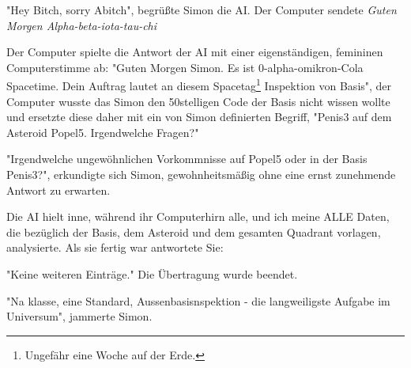 \documentclass[ebook]{article}
\begin{document}
\begin{center}
"Hey Bitch, sorry Abitch", begrüßte Simon die AI. Der
Computer sendete \emph{Guten Morgen Alpha-beta-iota-tau-chi}
\end{center}

\begin{center}
Der Computer spielte die Antwort der AI mit einer eigenständigen,
femininen Computerstimme ab: "Guten Morgen Simon. Es ist
0-alpha-omikron-Cola Spacetime. Dein Auftrag lautet an diesem
Spacetag\footnote{Ungefähr eine Woche auf der Erde.} Inspektion von Basis", der Computer wusste das Simon
den 50stelligen Code der Basis nicht wissen wollte und ersetzte
diese daher mit ein von Simon definierten Begriff, "Penis3 auf dem
Asteroid Popel5. Irgendwelche Fragen?"
\end{center}

\begin{center}
"Irgendwelche ungewöhnlichen Vorkommnisse auf Popel5 oder in der
Basis Penis3?", erkundigte sich Simon, gewohnheitsmäßig ohne eine
ernst zunehmende Antwort zu erwarten.
\end{center}

\noindent Die AI hielt inne, während ihr Computerhirn alle, und ich
meine ALLE Daten, die bezüglich der Basis, dem Asteroid und dem
gesamten Quadrant vorlagen, analysierte. Als sie fertig war
antwortete Sie:

\begin{center}
"Keine weiteren Einträge." Die Übertragung wurde beendet.
\end{center}

\begin{center}
"Na klasse, eine Standard, Aussenbasisnspektion - die langweiligste
Aufgabe im Universum", jammerte Simon.
\end{center}
\end{document}
